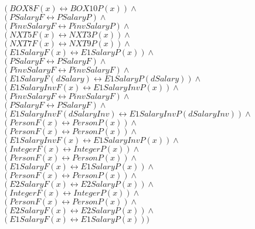\documentclass[a4paper,10pt]{article}
\begin{document}
 $ (BOX8F(x) \leftrightarrow BOX10P(x)) \land $ \\ 
 $ (PSalaryF \leftrightarrow PSalaryP) \land $ \\ 
 $ (PinvSalaryF \leftrightarrow PinvSalaryP) \land $ \\ 
 $ (NXT5F(x) \leftrightarrow NXT3P(x)) \land $ \\ 
 $ (NXT7F(x) \leftrightarrow NXT9P(x)) \land $ \\ 
 $ (E1SalaryF(x) \leftrightarrow E1SalaryP(x)) \land $ \\ 
 $ (PSalaryF \leftrightarrow PSalaryF) \land $ \\ 
 $ (PinvSalaryF \leftrightarrow PinvSalaryF) \land $ \\ 
 $ (E1SalaryF(dSalary) \leftrightarrow E1SalaryP(dSalary)) \land $ \\ 
 $ (E1SalaryInvF(x) \leftrightarrow E1SalaryInvP(x)) \land $ \\ 
 $ (PinvSalaryF \leftrightarrow PinvSalaryF) \land $ \\ 
 $ (PSalaryF \leftrightarrow PSalaryF) \land $ \\ 
 $ (E1SalaryInvF(dSalaryInv) \leftrightarrow E1SalaryInvP(dSalaryInv)) \land $ \\ 
 $ (PersonF(x) \leftrightarrow PersonP(x)) \land $ \\ 
 $ (PersonF(x) \leftrightarrow PersonP(x)) \land $ \\ 
 $ (E1SalaryInvF(x) \leftrightarrow E1SalaryInvP(x)) \land $ \\ 
 $ (IntegerF(x) \leftrightarrow IntegerP(x)) \land $ \\ 
 $ (PersonF(x) \leftrightarrow PersonP(x)) \land $ \\ 
 $ (E1SalaryF(x) \leftrightarrow E1SalaryP(x)) \land $ \\ 
 $ (PersonF(x) \leftrightarrow PersonP(x)) \land $ \\ 
 $ (E2SalaryF(x) \leftrightarrow E2SalaryP(x)) \land $ \\ 
 $ (IntegerF(x) \leftrightarrow IntegerP(x)) \land $ \\ 
 $ (PersonF(x) \leftrightarrow PersonP(x)) \land $ \\ 
 $ (E2SalaryF(x) \leftrightarrow E2SalaryP(x)) \land $ \\ 
 $ (E1SalaryF(x) \leftrightarrow E1SalaryP(x)))$ 
\end{document}
